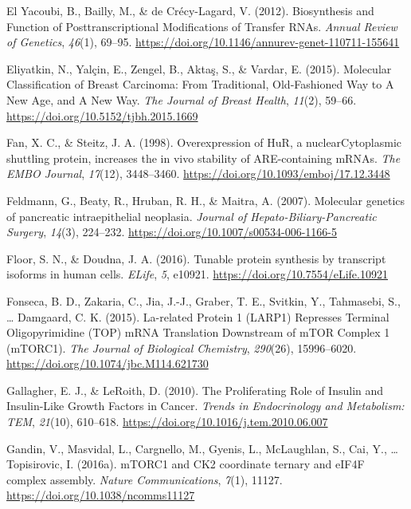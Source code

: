 \documentclass[12pt,openany]{book}
\begin{document}
\hypertarget{ref-ElYacoubi2012}{}
El Yacoubi, B., Bailly, M., \& de Crécy-Lagard, V. (2012). Biosynthesis
and Function of Posttranscriptional Modifications of Transfer RNAs.
\emph{Annual Review of Genetics}, \emph{46}(1), 69--95.
\url{https://doi.org/10.1146/annurev-genet-110711-155641}

\hypertarget{ref-Eliyatkin2015}{}
Eliyatkin, N., Yalçin, E., Zengel, B., Aktaş, S., \& Vardar, E. (2015).
Molecular Classification of Breast Carcinoma: From Traditional,
Old-Fashioned Way to A New Age, and A New Way. \emph{The Journal of
Breast Health}, \emph{11}(2), 59--66.
\url{https://doi.org/10.5152/tjbh.2015.1669}

\hypertarget{ref-Fan1998}{}
Fan, X. C., \& Steitz, J. A. (1998). Overexpression of HuR, a
nuclearCytoplasmic shuttling protein, increases the in vivo stability of
ARE-containing mRNAs. \emph{The EMBO Journal}, \emph{17}(12),
3448--3460. \url{https://doi.org/10.1093/emboj/17.12.3448}

\hypertarget{ref-Feldmann2007}{}
Feldmann, G., Beaty, R., Hruban, R. H., \& Maitra, A. (2007). Molecular
genetics of pancreatic intraepithelial neoplasia. \emph{Journal of
Hepato-Biliary-Pancreatic Surgery}, \emph{14}(3), 224--232.
\url{https://doi.org/10.1007/s00534-006-1166-5}

\hypertarget{ref-Floor2016}{}
Floor, S. N., \& Doudna, J. A. (2016). Tunable protein synthesis by
transcript isoforms in human cells. \emph{ELife}, \emph{5}, e10921.
\url{https://doi.org/10.7554/eLife.10921}

\hypertarget{ref-Fonseca2015}{}
Fonseca, B. D., Zakaria, C., Jia, J.-J., Graber, T. E., Svitkin, Y.,
Tahmasebi, S., \ldots{} Damgaard, C. K. (2015). La-related Protein 1
(LARP1) Represses Terminal Oligopyrimidine (TOP) mRNA Translation
Downstream of mTOR Complex 1 (mTORC1). \emph{The Journal of Biological
Chemistry}, \emph{290}(26), 15996--6020.
\url{https://doi.org/10.1074/jbc.M114.621730}

\hypertarget{ref-Gallagher2010}{}
Gallagher, E. J., \& LeRoith, D. (2010). The Proliferating Role of
Insulin and Insulin-Like Growth Factors in Cancer. \emph{Trends in
Endocrinology and Metabolism: TEM}, \emph{21}(10), 610--618.
\url{https://doi.org/10.1016/j.tem.2010.06.007}

\hypertarget{ref-Gandin2016}{}
Gandin, V., Masvidal, L., Cargnello, M., Gyenis, L., McLaughlan, S.,
Cai, Y., \ldots{} Topisirovic, I. (2016a). mTORC1 and CK2 coordinate
ternary and eIF4F complex assembly. \emph{Nature Communications},
\emph{7}(1), 11127. \url{https://doi.org/10.1038/ncomms11127}
\end{document}
